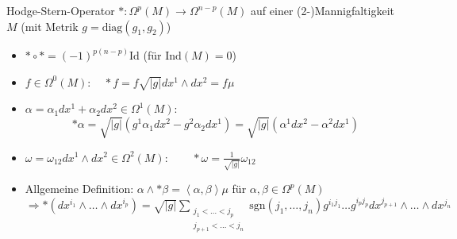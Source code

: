 \documentclass{beamer}
\begin{document}
  \begin{frame}
    \begin{block}{Hodge-Stern-Operator \( *: \Omega^{p}(M) \longrightarrow \Omega^{n-p}(M)\) auf einer (2-)Mannigfaltigkeit \( M \) (mit Metrik \( g = \text{diag}(g_{1}, g_{2}) \))}
      \begin{itemize}
        \item \( * \circ * = (-1)^{p(n-p)}\text{Id} \) \qquad (für \( \text{Ind}(M) = 0 \))
        \item \( f \in \Omega^{0}(M):\quad * f = f \sqrt{|g|} dx^{1}\wedge dx^{2}  = f\mu\) 
        \item \( \alpha = \alpha_{1}dx^{1} + \alpha_{2}dx^{2} \in \Omega^{1}(M):\) 
              \[ *\alpha = \sqrt{|g|} \left( g^{1} \alpha_{1}dx^{2} - g^{2} \alpha_{2}dx^{1} \right) = \sqrt{|g|} \left( \alpha^{1}dx^{2} - \alpha^{2}dx^{1} \right)\]
        \item \( \omega = \omega_{12}dx^{1}\wedge dx^{2} \in \Omega^{2}(M):\qquad *\omega = \frac{1}{\sqrt{|g|}}\omega_{12} \)
        \item Allgemeine Definition: \( \alpha \wedge *\beta = \left\langle \alpha , \beta \right\rangle \mu\) für \( \alpha, \beta \in \Omega^{p}(M) \)\\
              \( \Rightarrow *\left( dx^{i_{1}} \wedge \ldots \wedge dx^{i_{p}} \right) 
                  = \sqrt{|g|} \sum_{\begin{smallmatrix}
                                          j_{1}<\ldots<j_{p} \\
                                          j_{p+1}<\ldots<j_{n}
                                     \end{smallmatrix}} \text{sgn}\left( j_{1}, \ldots, j_{n} \right) g^{i_{1}j_{1}}\ldots g^{i_{p}j_{p}} dx^{j_{p+1}} \wedge \ldots \wedge dx^{j_{n}}\)
      \end{itemize}
    \end{block}
  \end{frame}
\end{document}
